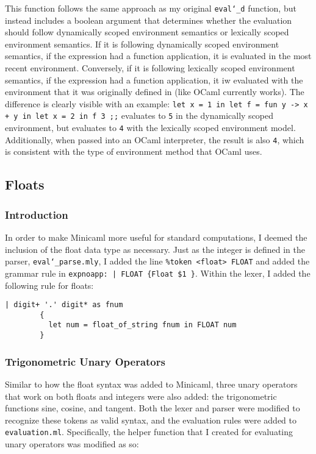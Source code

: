 \documentclass{article}
\begin{document}
This function follows the same approach as my original \texttt{eval\char`_d} function, but instead includes a boolean argument that determines whether the evaluation should follow dynamically scoped environment semantics or lexically scoped environment semantics. If it is following dynamically scoped environment semantics, if the expression had a function application, it is evaluated in the most recent environment. Conversely, if it is following lexically scoped environment semantics, if the expression had a function application, it iw evaluated with the environment that it was originally defined in (like OCaml currently works). The difference is clearly visible with an example: \texttt{let x = 1 in let f = fun y -> x + y in let x = 2 in f 3 ;;} evaluates to \texttt{5} in the dynamically scoped environment, but evaluates to \texttt{4} with the lexically scoped environment model. Additionally, when passed into an OCaml interpreter, the result is also \texttt{4}, which is consistent with the type of environment method that OCaml uses. 

\subsection{Floats}

\subsubsection{Introduction}

In order to make Minicaml more useful for standard computations, I deemed the inclusion of the float data type as necessary. Just as the integer is defined in the parser, \texttt{eval\char`_parse.mly}, I added the line \texttt{\%token <float> FLOAT} and added the grammar rule in \texttt{expnoapp: | FLOAT         \{Float \$1 \}}. Within the lexer, I added the following rule for floats: 

\begin{verbatim}
| digit+ '.' digit* as fnum
        {
          let num = float_of_string fnum in FLOAT num
        }
\end{verbatim}

\subsubsection{Trigonometric Unary Operators}

Similar to how the float syntax was added to Minicaml, three unary operators that work on both floats and integers were also added: the trigonometric functions sine, cosine, and tangent. Both the lexer and parser were modified to recognize these tokens as valid syntax, and the evaluation rules were added to \texttt{evaluation.ml}. Specifically, the helper function that I created for evaluating unary operators was modified as so:
\end{document}
